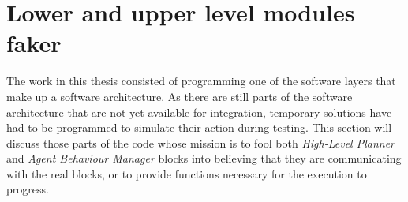 \section{Lower and upper level modules faker}
\label{sec:LowerAndUpperLevelModulesFaker}

The work in this thesis consisted of programming one of the software layers that make up a software architecture. As there are still parts of the software architecture that are not yet available for integration, temporary solutions have had to be programmed to simulate their action during testing. This section will discuss those parts of the code whose mission is to fool both \emph{High-Level Planner} and \emph{Agent Behaviour Manager} blocks into believing that they are communicating with the real blocks, or to provide functions necessary for the execution to progress.

